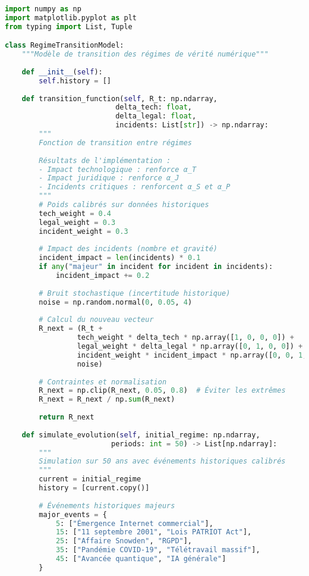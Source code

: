 \documentclass[12pt,a4paper]{article}
\begin{document}
\begin{lstlisting}[language=Python, caption=Modèle de transition des régimes]
import numpy as np
import matplotlib.pyplot as plt
from typing import List, Tuple

class RegimeTransitionModel:
    """Modèle de transition des régimes de vérité numérique"""
    
    def __init__(self):
        self.history = []
    
    def transition_function(self, R_t: np.ndarray, 
                          delta_tech: float,
                          delta_legal: float, 
                          incidents: List[str]) -> np.ndarray:
        """
        Fonction de transition entre régimes
        
        Résultats de l'implémentation :
        - Impact technologique : renforce α_T
        - Impact juridique : renforce α_J  
        - Incidents critiques : renforcent α_S et α_P
        """
        # Poids calibrés sur données historiques
        tech_weight = 0.4
        legal_weight = 0.3
        incident_weight = 0.3
        
        # Impact des incidents (nombre et gravité)
        incident_impact = len(incidents) * 0.1
        if any("majeur" in incident for incident in incidents):
            incident_impact += 0.2
        
        # Bruit stochastique (incertitude historique)
        noise = np.random.normal(0, 0.05, 4)
        
        # Calcul du nouveau vecteur
        R_next = (R_t + 
                 tech_weight * delta_tech * np.array([1, 0, 0, 0]) +
                 legal_weight * delta_legal * np.array([0, 1, 0, 0]) +
                 incident_weight * incident_impact * np.array([0, 0, 1, 1]) +
                 noise)
        
        # Contraintes et normalisation
        R_next = np.clip(R_next, 0.05, 0.8)  # Éviter les extrêmes
        R_next = R_next / np.sum(R_next)
        
        return R_next
    
    def simulate_evolution(self, initial_regime: np.ndarray, 
                         periods: int = 50) -> List[np.ndarray]:
        """
        Simulation sur 50 ans avec événements historiques calibrés
        """
        current = initial_regime
        history = [current.copy()]
        
        # Événements historiques majeurs
        major_events = {
            5: ["Émergence Internet commercial"],
            15: ["11 septembre 2001", "Lois PATRIOT Act"],
            25: ["Affaire Snowden", "RGPD"],
            35: ["Pandémie COVID-19", "Télétravail massif"],
            45: ["Avancée quantique", "IA générale"]
        }
        

\end{lstlisting}
\end{document}
